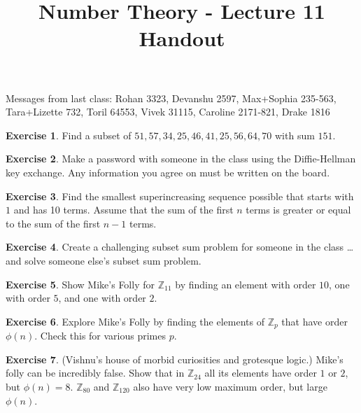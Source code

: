 \documentclass[11pt]{article}
\theoremstyle{definition}
\newtheorem{exercise}{Exercise}
\numberwithin{thm}{section}
\begin{document}
\title{Number Theory - Lecture 11 Handout}

\maketitle


Messages from last class: Rohan 3323, Devanshu 2597, Max+Sophia 235-563, Tara+Lizette 732, Toril 64553, Vivek 31115, Caroline 2171-821, Drake 1816 

\begin{exercise} Find a subset of $51, 57, 34, 25, 46, 41, 25, 56, 64, 70$ with sum $151$.
\end{exercise}

\begin{exercise} Make a password with someone in the class using the Diffie-Hellman key exchange. Any information you agree on must be written on the board.
\end{exercise}

\begin{exercise} Find the smallest superincreasing sequence possible that starts with $1$ and has 10 terms. Assume that the sum of the first $n$ terms is greater or equal to the sum of the first $n-1$ terms.  
\end{exercise}

\begin{exercise} Create a challenging subset sum problem for someone in the class \ldots and solve someone else's subset sum problem.
\end{exercise}

\begin{exercise} Show Mike's Folly for $\mathbb{Z}_11$ by finding an element with order $10$, one with order $5$, and one with order $2$.
\end{exercise}

\begin{exercise} Explore Mike's Folly by finding the elements of $\mathbb{Z}_p$ that have order $\phi(n)$. Check this for various primes $p$.
\end{exercise}

\begin{exercise} (Vishnu's house of morbid curiosities and grotesque logic.) Mike's folly can be incredibly false. Show that in $\mathbb{Z}_{24}$ all its elements have order $1$ or $2$, but $\phi(n) = 8$. $\mathbb{Z}_{80}$ and $\mathbb{Z}_{120}$ also have very low maximum order, but large $\phi(n)$.
\end{exercise}
\end{document}
